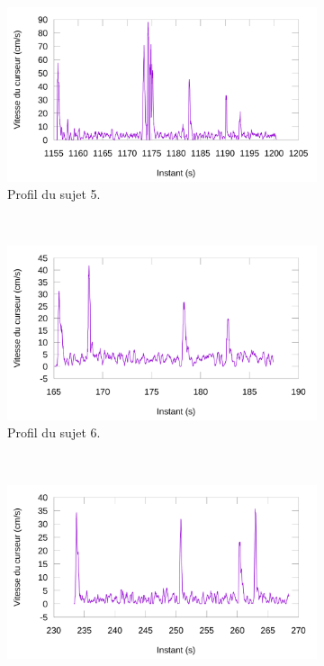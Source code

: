 	\begin{figure}[htb]
		\centering
		\begin{subfigure}[t]{\subImgWlineplot}
			\centering
			\includegraphics[width=\textwidth]{figures/ch4/subject_05_60_8_219_smoothed}
			\caption{Profil du sujet 5.}
			\label{fig:hardProfile5}
		\end{subfigure}
		~
		\begin{subfigure}[t]{\subImgWlineplot}
			\centering
			\includegraphics[width=\textwidth]{figures/ch4/subject_06_60_13_219_smoothed}
			\caption{Profil du sujet 6.}
			\label{fig:hardProfile6}
		\end{subfigure}
		~
		\begin{subfigure}[t]{\subImgWlineplot}
			\centering
			\includegraphics[width=\textwidth]{figures/ch4/subject_08_180_8_219_smoothed}

\end{subfigure}
\end{figure}
